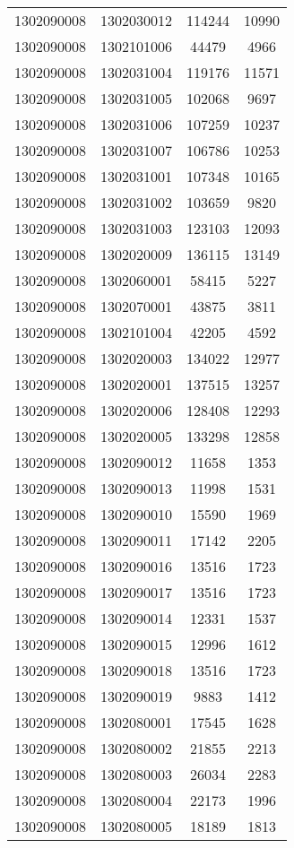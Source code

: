 \begin{longtable}{llcc}
1302090008 & 1302030012 & 114244 & 10990\\
1302090008 & 1302101006 & 44479 & 4966\\
1302090008 & 1302031004 & 119176 & 11571\\
1302090008 & 1302031005 & 102068 & 9697\\
1302090008 & 1302031006 & 107259 & 10237\\
1302090008 & 1302031007 & 106786 & 10253\\
1302090008 & 1302031001 & 107348 & 10165\\
1302090008 & 1302031002 & 103659 & 9820\\
1302090008 & 1302031003 & 123103 & 12093\\
1302090008 & 1302020009 & 136115 & 13149\\
1302090008 & 1302060001 & 58415 & 5227\\
1302090008 & 1302070001 & 43875 & 3811\\
1302090008 & 1302101004 & 42205 & 4592\\
1302090008 & 1302020003 & 134022 & 12977\\
1302090008 & 1302020001 & 137515 & 13257\\
1302090008 & 1302020006 & 128408 & 12293\\
1302090008 & 1302020005 & 133298 & 12858\\
1302090008 & 1302090012 & 11658 & 1353\\
1302090008 & 1302090013 & 11998 & 1531\\
1302090008 & 1302090010 & 15590 & 1969\\
1302090008 & 1302090011 & 17142 & 2205\\
1302090008 & 1302090016 & 13516 & 1723\\
1302090008 & 1302090017 & 13516 & 1723\\
1302090008 & 1302090014 & 12331 & 1537\\
1302090008 & 1302090015 & 12996 & 1612\\
1302090008 & 1302090018 & 13516 & 1723\\
1302090008 & 1302090019 & 9883 & 1412\\
1302090008 & 1302080001 & 17545 & 1628\\
1302090008 & 1302080002 & 21855 & 2213\\
1302090008 & 1302080003 & 26034 & 2283\\
1302090008 & 1302080004 & 22173 & 1996\\
1302090008 & 1302080005 & 18189 & 1813\\

\end{longtable}
